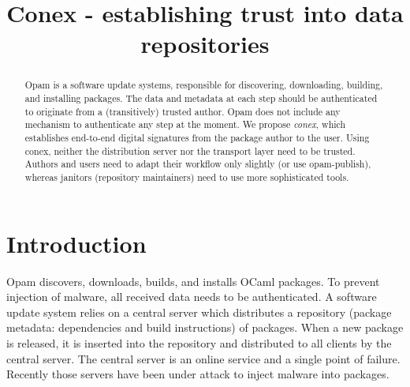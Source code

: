\documentclass[nocopyrightspace]{sigplanconf}
\begin{document}
\setlength{\pdfpageheight}{\paperheight}
\setlength{\pdfpagewidth}{\paperwidth}

\title{Conex - establishing trust into data repositories}


\date{}

\maketitle

\begin{abstract}
  Opam is a software update systems, responsible for discovering, downloading, building, and installing packages.
  The data and metadata at each step should be authenticated to originate from a (transitively) trusted author.
  Opam does not include any mechanism to authenticate any step at the moment.
  We propose \emph{conex}, which establishes end-to-end digital signatures from the package author to the user.
  Using conex, neither the distribution server nor the transport layer need to be trusted.
  Authors and users need to adapt their workflow only slightly (or use opam-publish), whereas janitors (repository maintainers) need to use more sophisticated tools.
\end{abstract}

\section{Introduction}
Opam discovers, downloads, builds, and installs OCaml packages.
To prevent injection of malware, all received data needs to be authenticated.
A software update system relies on a central server which distributes a repository (package metadata: dependencies and build instructions) of packages.
When a new package is released, it is inserted into the repository and distributed to all clients by the central server.
The central server is an online service and a single point of failure.
Recently those servers have been under attack \cite{adobe,apache2,apache1,opera,kernel,cabal,kernelorg,debian,freebsd,php3,savannah,maven,savannah2,npm,php,phpmyadmin,php2,github,ocamlforge,redhatssh,gentoo,rubygems,fedora,wordpress} to inject malware into packages.
\end{document}

